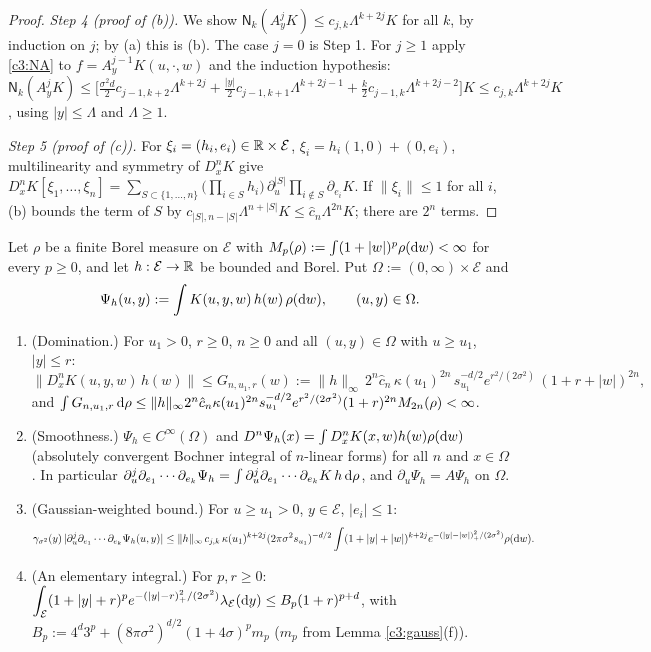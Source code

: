 \begin{proof}
\emph{Step 4 (proof of (b)).} We show $\mathsf N_k(A_y^jK)\le c_{j,k}\Lambda^{k+2j}K$ for all $k$, by induction on $j$; by (a) this is (b). The case $j=0$ is Step 1. For $j\ge1$ apply \eqref{c3:NA} to $f=A_y^{j-1}K(u,\cdot,w)$ and the induction hypothesis:
$\mathsf N_k(A_y^jK)\le\big[\frac{\sigma^2d}2c_{j-1,k+2}\Lambda^{k+2j}+\frac{|y|}2c_{j-1,k+1}\Lambda^{k+2j-1}+\frac k2c_{j-1,k}\Lambda^{k+2j-2}\big]K\le c_{j,k}\Lambda^{k+2j}K$, using $|y|\le\Lambda$ and $\Lambda\ge1$.

\emph{Step 5 (proof of (c)).} For $\xi_i=(h_i,e_i)\in\mathbb{R}\times\mathcal E$, $\xi_i=h_i(1,0)+(0,e_i)$, multilinearity and symmetry of $D^n_xK$ give
$D^n_xK[\xi_1,\dots,\xi_n]=\sum_{S\subset\{1,\dots,n\}}\big(\prod_{i\in S}h_i\big)\,\partial_u^{|S|}\prod_{i\notin S}\partial_{e_i}K$.
If $\|\xi_i\|\le1$ for all $i$, (b) bounds the term of $S$ by $c_{|S|,n-|S|}\Lambda^{n+|S|}K\le\hat c_n\Lambda^{2n}K$; there are $2^n$ terms.
\end{proof}

\begin{auxlemma}\label{c3:smooth}
Let $\rho$ be a finite Borel measure on $\mathcal E$ with $M_p(\rho):=\int(1+|w|)^p\rho(\mathrm{d} w)<\infty$ for every $p\ge0$, and let $h:\mathcal E\to\mathbb{R}$ be bounded and Borel. Put $\Omega:=(0,\infty)\times\mathcal E$ and
\[
\Psi_h(u,y):=\int K(u,y,w)\,h(w)\,\rho(\mathrm{d} w),\qquad (u,y)\in\Omega .
\]
\begin{enumerate}[label=(\alph*),itemsep=1pt]
\item (Domination.) For $u_1>0$, $r\ge0$, $n\ge0$ and all $(u,y)\in\Omega$ with $u\ge u_1$, $|y|\le r$:
\begin{equation}\label{c3:dom}
\|D^n_xK(u,y,w)\,h(w)\|\le G_{n,u_1,r}(w):=\|h\|_\infty\,2^n\hat c_n\,\kappa(u_1)^{2n}\,s_{u_1}^{-d/2}e^{r^2/(2\sigma^2)}\,(1+r+|w|)^{2n},
\end{equation}
and $\int G_{n,u_1,r}\,\mathrm{d}\rho\le\|h\|_\infty2^n\hat c_n\kappa(u_1)^{2n}s_{u_1}^{-d/2}e^{r^2/(2\sigma^2)}(1+r)^{2n}M_{2n}(\rho)<\infty$.
\item (Smoothness.) $\Psi_h\in C^\infty(\Omega)$ and $D^n\Psi_h(x)=\int D^n_xK(x,w)h(w)\rho(\mathrm{d} w)$ (absolutely convergent Bochner integral of $n$-linear forms) for all $n$ and $x\in\Omega$. In particular $\partial_u^j\partial_{e_1}\cdots\partial_{e_k}\Psi_h=\int\partial_u^j\partial_{e_1}\cdots\partial_{e_k}K\,h\,\mathrm{d}\rho$, and $\partial_u\Psi_h=A\Psi_h$ on $\Omega$.
\item (Gaussian-weighted bound.) For $u\ge u_1>0$, $y\in\mathcal E$, $|e_i|\le1$:
\[
\gamma_{\sigma^2}(y)\,|\partial_u^j\partial_{e_1}\cdots\partial_{e_k}\Psi_h(u,y)|\le\|h\|_\infty\,c_{j,k}\,\kappa(u_1)^{k+2j}(2\pi\sigma^2s_{u_1})^{-d/2}\int(1+|y|+|w|)^{k+2j}e^{-(|y|-|w|)_+^2/(2\sigma^2)}\rho(\mathrm{d} w).
\]
\item (An elementary integral.) For $p,r\ge0$:
$\displaystyle\int_{\mathcal E}(1+|y|+r)^pe^{-(|y|-r)_+^2/(2\sigma^2)}\lambda_{\mathcal E}(\mathrm{d} y)\le B_p(1+r)^{p+d}$, with
$B_p:=4^d3^p+(8\pi\sigma^2)^{d/2}(1+4\sigma)^pm_p$ ($m_p$ from Lemma \ref{c3:gauss}(f)).
\end{enumerate}
\end{auxlemma}

